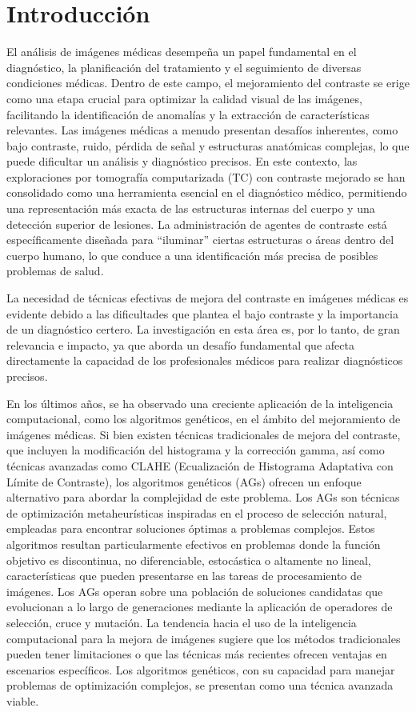 \chapter{Introducción}
El análisis de imágenes médicas desempeña un papel fundamental en el diagnóstico, la planificación del tratamiento y el seguimiento de diversas condiciones médicas. Dentro de este campo, el mejoramiento del contraste se erige como una etapa crucial para optimizar la calidad visual de las imágenes, facilitando la identificación de anomalías y la extracción de características relevantes. Las imágenes médicas a menudo presentan desafíos inherentes, como bajo contraste, ruido, pérdida de señal y estructuras anatómicas complejas, lo que puede dificultar un análisis y diagnóstico precisos. En este contexto, las exploraciones por tomografía computarizada (TC) con contraste mejorado se han consolidado como una herramienta esencial en el diagnóstico médico, permitiendo una representación más exacta de las estructuras internas del cuerpo y una detección superior de lesiones. La administración de agentes de contraste está específicamente diseñada para ``iluminar'' ciertas estructuras o áreas dentro del cuerpo humano, lo que conduce a una identificación más precisa de posibles problemas de salud.

La necesidad de técnicas efectivas de mejora del contraste en imágenes médicas es evidente debido a las dificultades que plantea el bajo contraste y la importancia de un diagnóstico certero. La investigación en esta área es, por lo tanto, de gran relevancia e impacto, ya que aborda un desafío fundamental que afecta directamente la capacidad de los profesionales médicos para realizar diagnósticos precisos.

En los últimos años, se ha observado una creciente aplicación de la inteligencia computacional, como los algoritmos genéticos, en el ámbito del mejoramiento de imágenes médicas. Si bien existen técnicas tradicionales de mejora del contraste, que incluyen la modificación del histograma y la corrección gamma, así como técnicas avanzadas como CLAHE (Ecualización de Histograma Adaptativa con Límite de Contraste), los algoritmos genéticos (AGs) ofrecen un enfoque alternativo para abordar la complejidad de este problema. Los AGs son técnicas de optimización metaheurísticas inspiradas en el proceso de selección natural, empleadas para encontrar soluciones óptimas a problemas complejos. Estos algoritmos resultan particularmente efectivos en problemas donde la función objetivo es discontinua, no diferenciable, estocástica o altamente no lineal, características que pueden presentarse en las tareas de procesamiento de imágenes. Los AGs operan sobre una población de soluciones candidatas que evolucionan a lo largo de generaciones mediante la aplicación de operadores de selección, cruce y mutación. La tendencia hacia el uso de la inteligencia computacional para la mejora de imágenes sugiere que los métodos tradicionales pueden tener limitaciones o que las técnicas más recientes ofrecen ventajas en escenarios específicos. Los algoritmos genéticos, con su capacidad para manejar problemas de optimización complejos, se presentan como una técnica avanzada viable.

